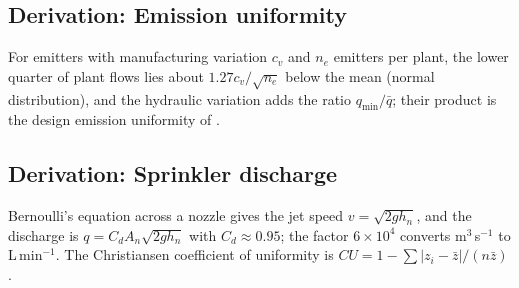 \subsection{Derivation: Emission uniformity}\label{der:s2:12}
For emitters with manufacturing variation $c_v$ and $n_e$ emitters per plant, the lower quarter of plant flows lies about $1.27c_v/\sqrt{n_e}$ below the mean (normal distribution), and the hydraulic variation adds the ratio $q_{\min}/\bar q$; their product is the design emission uniformity of \citet{KellerKarmeli1974}.


\subsection{Derivation: Sprinkler discharge}\label{der:s2:13}
Bernoulli's equation across a nozzle gives the jet speed $v=\sqrt{2gh_n}$, and the discharge is $q=C_dA_n\sqrt{2gh_n}$ with $C_d\approx0.95$; the factor $6\times10^4$ converts m$^3$\,s$^{-1}$ to L\,min$^{-1}$. The Christiansen coefficient of uniformity is $CU=1-\sum|z_i-\bar z|/(n\bar z)$.


